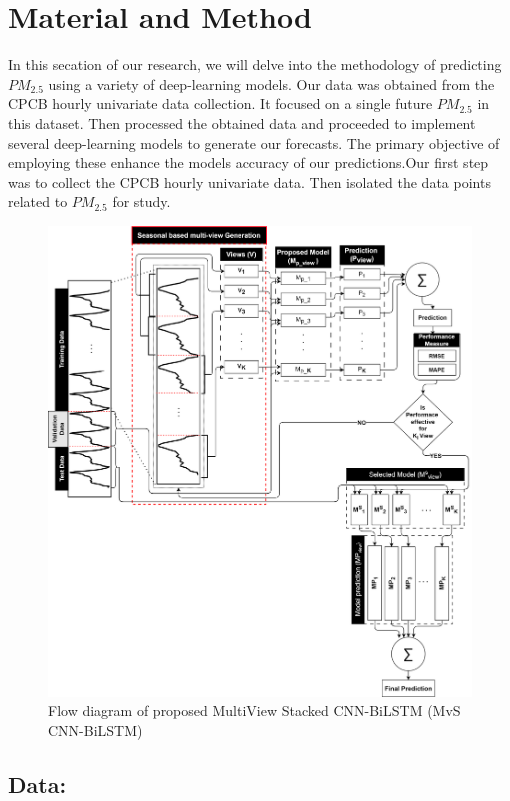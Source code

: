 \documentclass[a4paper,fleqn]{cas-dc}
\begin{document}
\section{Material and Method}
In this secation of our research, we will delve into the methodology of predicting $PM_{2.5}$ using a variety of deep-learning models. Our data was obtained from the CPCB hourly univariate data collection. It focused on a single future $PM_{2.5}$ in this dataset. Then processed the obtained data and proceeded to implement several deep-learning models to generate our forecasts. The primary objective of employing these enhance the models accuracy of our predictions.Our first step was to collect the CPCB hourly univariate data. Then isolated the data points related to $PM_{2.5}$ for study.
\begin{figure}[h!]
	\centering
		\includegraphics[scale=0.6]{img/MvS CNN-BiLSTM}
	  \caption{Flow diagram of proposed MultiView Stacked CNN-BiLSTM (MvS CNN-BiLSTM)}\label{Muticbilstm}
\end{figure}


\subsection{Data:}
\end{document}
